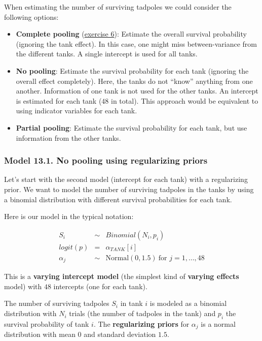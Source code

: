 \documentclass[
]{book}
\providecommand{\tightlist}{%
  \setlength{\itemsep}{0pt}\setlength{\parskip}{0pt}}
\begin{document}
When estimating the number of surviving tadpoles we could consider the following options:

\begin{itemize}
\tightlist
\item
  \textbf{Complete pooling} (\hyperref[exercise6_LMM]{exercise 6}): Estimate the overall survival probability
  (ignoring the tank effect).
  In this case, one might miss between-variance from the different tanks.
  A single intercept is used for all tanks.
\item
  \textbf{No pooling}: Estimate the survival probability for each tank (ignoring the overall effect completely).
  Here, the tanks do not ``know'' anything from one another. Information of one tank is not used for the other tanks.
  An intercept is estimated for each tank (\(48\) in total).
  This approach would be equivalent to using indicator variables for each tank.
\item
  \textbf{Partial pooling}: Estimate the survival probability for each tank,
  but use information from the other tanks.
\end{itemize}

\subsubsection{Model 13.1. No pooling using regularizing priors}\label{model13_1}

Let's start with the second model (intercept for each tank) with a regularizing prior.
We want to model the
number of surviving tadpoles in the tanks by using a binomial distribution with
different survival probabilities for each tank.

Here is our model in the typical notation:

\[
\begin{array}{rcl}
S_i &\sim& Binomial(N_i, p_i) \\
logit(p) &=& \alpha_{TANK}[i] \\
\alpha_j &\sim& \text{Normal}(0, 1.5)~\text{for } j=1,\ldots,48
\end{array}
\]

This is a \textbf{varying intercept model} (the simplest kind of \textbf{varying effects} model)
with \(48\) intercepts (one for each tank).

The number of surviving tadpoles \(S_i\) in tank \(i\) is modeled as a binomial distribution with
\(N_i\) trials (the number of tadpoles in the tank) and \(p_i\) the survival probability of tank \(i\).
The \textbf{regularizing priors} for \(\alpha_j\) is a normal distribution with mean \(0\) and standard deviation \(1.5\).
\end{document}
